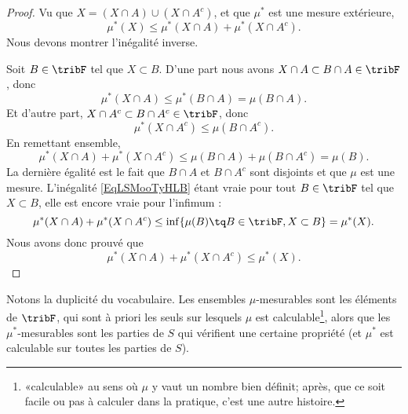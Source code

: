 \begin{proof}
    Vu que \( X=(X\cap A)\cup(X\cap A^c)\), et que \( \mu^*\) est une mesure extérieure,
    \begin{equation}
        \mu^*(X)\leq \mu^*(X\cap A)+\mu^*(X\cap A^c).
    \end{equation}
    Nous devons montrer l'inégalité inverse.

    Soit \( B\in\tribF\) tel que \( X\subset B\). D'une part nous avons \( X\cap A\subset B\cap A\in\tribF\), donc
    \begin{equation}
        \mu^*(X\cap A)\leq \mu^*(B\cap A)= \mu(B\cap A).
    \end{equation}
    Et d'autre part, \( X\cap A^c\subset B\cap A^c\in\tribF\), donc
    \begin{equation}
        \mu^*(X\cap A^c)\leq \mu(B\cap A^c).
    \end{equation}
    En remettant ensemble,
    \begin{equation}    \label{EqLSMooTyHLB}
        \mu^*(X\cap A)+\mu^*(X\cap A^c)\leq \mu(B\cap A)+\mu(B\cap A^c)=\mu(B).
    \end{equation}
    La dernière égalité est le fait que \( B\cap A\) et \( B\cap A^c\) sont disjoints et que \( \mu\) est une mesure. L'inégalité \eqref{EqLSMooTyHLB} étant vraie pour tout \( B\in \tribF\) tel que \( X\subset B\), elle est encore vraie pour l'infimum :
    \begin{equation}
        \mu^*(X\cap A)+\mu^*(X\cap A^c)\leq \inf \{ \mu(B)\tq B\in\tribF,X\subset B \}=\mu^*(X).
    \end{equation}
    Nous avons donc prouvé que
    \begin{equation}
        \mu^*(X\cap A)+\mu^*(X\cap A^c)\leq \mu^*(X).
    \end{equation}
\end{proof}

\begin{remark}
Notons la duplicité du vocabulaire. Les ensembles \( \mu\)-mesurables sont les éléments de \( \tribF\), qui sont à priori les seuls sur lesquels \( \mu\) est calculable\footnote{«calculable» au sens où \( \mu\) y vaut un nombre bien définit; après, que ce soit facile ou pas à calculer dans la pratique, c'est une autre histoire.}, alors que les \( \mu^*\)-mesurables sont les parties de \( S\) qui vérifient une certaine propriété (et \( \mu^*\) est calculable sur toutes les parties de \( S\)).
\end{remark}
